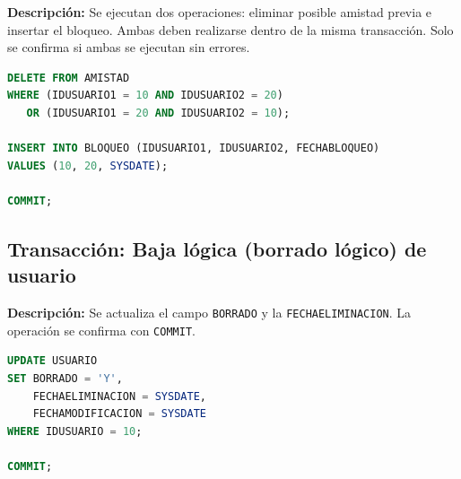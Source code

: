 \textbf{Descripción:} Se ejecutan dos operaciones: eliminar posible amistad previa e insertar el bloqueo. Ambas deben realizarse dentro de la misma transacción. Solo se confirma si ambas se ejecutan sin errores.

\begin{lstlisting}[language=SQL, caption={Transacción de bloqueo con consistencia relacional}]
DELETE FROM AMISTAD
WHERE (IDUSUARIO1 = 10 AND IDUSUARIO2 = 20)
   OR (IDUSUARIO1 = 20 AND IDUSUARIO2 = 10);

INSERT INTO BLOQUEO (IDUSUARIO1, IDUSUARIO2, FECHABLOQUEO)
VALUES (10, 20, SYSDATE);

COMMIT;
\end{lstlisting}

\subsection{Transacción: Baja lógica (borrado lógico) de usuario}

\textbf{Descripción:} Se actualiza el campo \texttt{BORRADO} y la \texttt{FECHAELIMINACION}. La operación se confirma con \texttt{COMMIT}.

\begin{lstlisting}[language=SQL, caption={Transacción de baja lógica de usuario}]
UPDATE USUARIO
SET BORRADO = 'Y',
    FECHAELIMINACION = SYSDATE,
    FECHAMODIFICACION = SYSDATE
WHERE IDUSUARIO = 10;

COMMIT;
\end{lstlisting}
